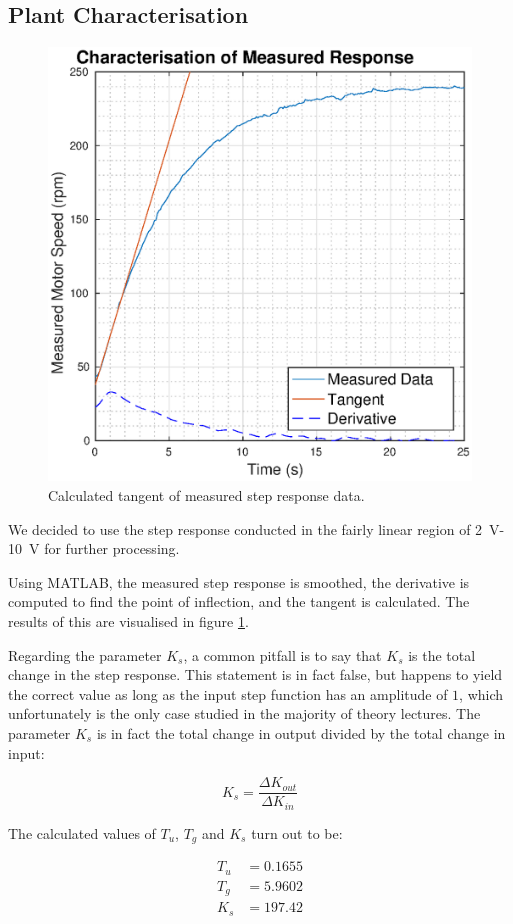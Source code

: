 \subsection{Plant Characterisation}
\label{sec:sim:characterisation}

\begin{figure}[t]
    \centering
    \includegraphics[width=\imagewidth]{images/characterisation}
    \caption{Calculated tangent of measured step response data.}
    \label{fig:characterisation}
\end{figure}

We decided  to  use the step response conducted in the fairly linear region of
\SI{2}{\volt}-\SI{10}{\volt} for further processing.

Using  MATLAB, the measured step  response  is  smoothed,  the  derivative  is
computed  to find the point of inflection, and the tangent is calculated.  The
results   of  this  are  visualised  in   figure   \ref{fig:characterisation}.

Regarding the parameter $K_s$, a common pitfall is to  say  that  $K_s$ is the
total  change in the step response. This  statement  is  in  fact  false,  but
happens to yield the correct value as long as the input step  function  has an
amplitude of $1$, which unfortunately is the only case studied in the majority
of theory lectures. The parameter $K_s$ is in fact the total change in  output
divided by the total change in input:

\begin{equation}
    K_s = \frac{\Delta K_{out}}{\Delta K_{in}}
\end{equation}

The calculated values of $T_u$, $T_g$ and $K_s$ turn out to be:

\begin{align*}
    T_u &= 0.1655 \\
    T_g &= 5.9602 \\
    K_s &= 197.42
\end{align*}

